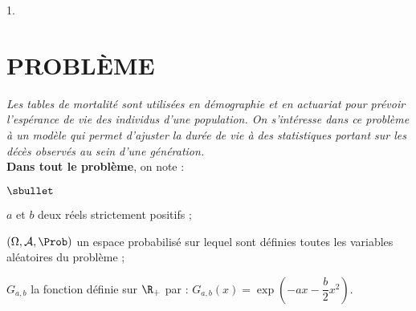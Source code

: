 \documentclass[11pt]{article}%
\begin{document}
\begin{noliste}{1.}




\end{noliste}




\section*{PROBLÈME}

\noindent %
{\it Les tables de mortalité sont utilisées en démographie et en
  actuariat pour prévoir l'espérance de vie des individus d'une
  population. On s'intéresse dans ce problème à un modèle qui permet
  d'ajuster la durée de vie à des statistiques portant sur les décès
  observés au sein d'une génération.}\\
{\bf Dans tout le problème}, on note :
\begin{noliste}{$\sbullet$}
\item $a$ et $b$ deux réels strictement positifs ;
\item $(\Omega,\mathcal{A},\Prob)$ un espace probabilisé sur lequel sont
  définies toutes les variables aléatoires du problème ;
\item $G_{a,b}$ la fonction définie sur $\R_+$ par :
  $G_{a,b}(x)=\exp\left(-ax-\dfrac{b}{2}x^2\right)$.
\end{noliste}
\end{document}
